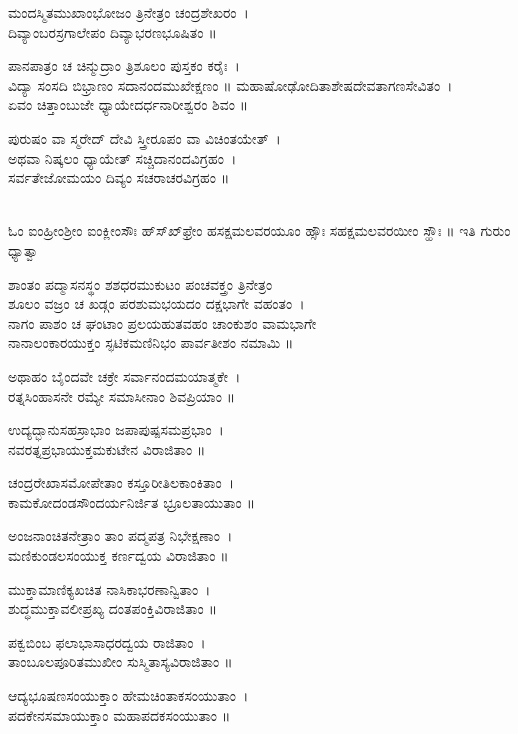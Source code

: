 ಮಂದಸ್ಮಿತಮುಖಾಂಭೋಜಂ ತ್ರಿನೇತ್ರಂ ಚಂದ್ರಶೇಖರಂ~।\\
ದಿವ್ಯಾಂಬರಸ್ರಗಾಲೇಪಂ ದಿವ್ಯಾಭರಣಭೂಷಿತಂ ॥

ಪಾನಪಾತ್ರಂ ಚ ಚಿನ್ಮುದ್ರಾಂ ತ್ರಿಶೂಲಂ ಪುಸ್ತಕಂ ಕರೈಃ~।\\
ವಿದ್ಯಾ ಸಂಸದಿ ಬಿಭ್ರಾಣಂ ಸದಾನಂದಮುಖೇಕ್ಷಣಂ ॥
\newpage
ಮಹಾಷೋಢೋದಿತಾಶೇಷದೇವತಾಗಣಸೇವಿತಂ~।\\
ಏವಂ ಚಿತ್ತಾಂಬುಜೇ ಧ್ಯಾಯೇದರ್ಧನಾರೀಶ್ವರಂ ಶಿವಂ ॥

ಪುರುಷಂ ವಾ ಸ್ಮರೇದ್ ದೇವಿ ಸ್ತ್ರೀರೂಪಂ ವಾ ವಿಚಿಂತಯೇತ್~।\\
ಅಥವಾ ನಿಷ್ಕಲಂ ಧ್ಯಾಯೇತ್ ಸಚ್ಚಿದಾನಂದವಿಗ್ರಹಂ~।\\
ಸರ್ವತೇಜೋಮಯಂ ದಿವ್ಯಂ ಸಚರಾಚರವಿಗ್ರಹಂ ॥

\\
ಓಂ ಐಂಹ್ರೀಂಶ್ರೀಂ ಐಂಕ್ಲೀಂಸೌಃ ಹ್‌ಸ್‌ಖ್‌ಫ್ರೇಂ ಹಸಕ್ಷಮಲವರಯೂಂ ಹ್ಸೌಃ ಸಹಕ್ಷಮಲವರಯೀಂ ಸ್ಹೌಃ ॥ ಇತಿ ಗುರುಂ ಧ್ಯಾತ್ವಾ

ಶಾಂತಂ ಪದ್ಮಾಸನಸ್ಥಂ ಶಶಧರಮುಕುಟಂ ಪಂಚವಕ್ತ್ರಂ ತ್ರಿನೇತ್ರಂ\\
ಶೂಲಂ ವಜ್ರಂ ಚ ಖಡ್ಗಂ ಪರಶುಮಭಯದಂ ದಕ್ಷಭಾಗೇ ವಹಂತಂ~।\\
ನಾಗಂ ಪಾಶಂ ಚ ಘಂಟಾಂ ಪ್ರಲಯಹುತವಹಂ ಚಾಂಕುಶಂ ವಾಮಭಾಗೇ\\
ನಾನಾಲಂಕಾರಯುಕ್ತಂ ಸ್ಫಟಿಕಮಣಿನಿಭಂ ಪಾರ್ವತೀಶಂ ನಮಾಮಿ ॥

ಅಥಾಹಂ ಬೈಂದವೇ ಚಕ್ರೇ ಸರ್ವಾನಂದಮಯಾತ್ಮಕೇ~।\\
ರತ್ನಸಿಂಹಾಸನೇ ರಮ್ಯೇ ಸಮಾಸೀನಾಂ ಶಿವಪ್ರಿಯಾಂ ॥

ಉದ್ಯದ್ಭಾನುಸಹಸ್ರಾಭಾಂ ಜಪಾಪುಷ್ಪಸಮಪ್ರಭಾಂ~।\\
ನವರತ್ನಪ್ರಭಾಯುಕ್ತಮಕುಟೇನ ವಿರಾಜಿತಾಂ ॥

ಚಂದ್ರರೇಖಾಸಮೋಪೇತಾಂ ಕಸ್ತೂರೀತಿಲಕಾಂಕಿತಾಂ~।\\
ಕಾಮಕೋದಂಡಸೌಂದರ್ಯನಿರ್ಜಿತ ಭ್ರೂಲತಾಯುತಾಂ ॥

ಅಂಜನಾಂಚಿತನೇತ್ರಾಂ ತಾಂ ಪದ್ಮಪತ್ರ ನಿಭೇಕ್ಷಣಾಂ~।\\
ಮಣಿಕುಂಡಲಸಂಯುಕ್ತ ಕರ್ಣದ್ವಯ ವಿರಾಜಿತಾಂ ॥

ಮುಕ್ತಾಮಾಣಿಕ್ಯಖಚಿತ ನಾಸಿಕಾಭರಣಾನ್ವಿತಾಂ~।\\
ಶುದ್ಧಮುಕ್ತಾವಲೀಪ್ರಖ್ಯ ದಂತಪಂಕ್ತಿವಿರಾಜಿತಾಂ ॥

ಪಕ್ವಬಿಂಬ ಫಲಾಭಾಸಾಧರದ್ವಯ ರಾಜಿತಾಂ~।\\
ತಾಂಬೂಲಪೂರಿತಮುಖೀಂ ಸುಸ್ಮಿತಾಸ್ಯವಿರಾಜಿತಾಂ ॥

ಆದ್ಯಭೂಷಣಸಂಯುಕ್ತಾಂ ಹೇಮಚಿಂತಾಕಸಂಯುತಾಂ~।\\
ಪದಕೇನಸಮಾಯುಕ್ತಾಂ ಮಹಾಪದಕಸಂಯುತಾಂ ॥

